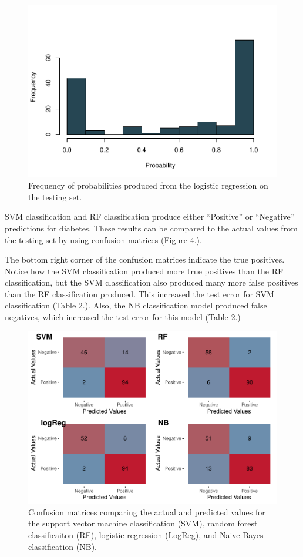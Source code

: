 \documentclass[
]{article}
\begin{document}
\begin{figure}[h!]
\centering
\includegraphics{FinalArticle_files/figure-latex/unnamed-chunk-6-1.pdf}
\caption{Frequency of probabilities produced from the logistic
regression on the testing set.}
\end{figure}

SVM classification and RF classification produce either ``Positive'' or
``Negative'' predictions for diabetes. These results can be compared to
the actual values from the testing set by using confusion matrices
(Figure 4.).

The bottom right corner of the confusion matrices indicate the true
positives. Notice how the SVM classification produced more true
positives than the RF classification, but the SVM classification also
produced many more false positives than the RF classification produced.
This increased the test error for SVM classification (Table 2.). Also,
the NB classification model produced false negatives, which increased
the test error for this model (Table 2.)

\begin{figure}[h!]
\centering
\includegraphics{FinalArticle_files/figure-latex/unnamed-chunk-11-1.pdf}
\caption{Confusion matrices comparing the actual and predicted values
for the support vector machine classification (SVM), random forest
classificaiton (RF), logistic regression (LogReg), and Naive Bayes
classification (NB).}
\end{figure}
\end{document}

